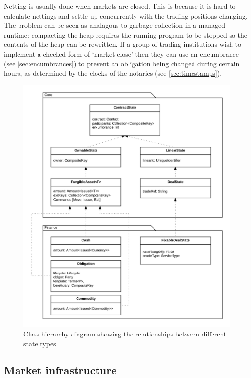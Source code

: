 \documentclass{article}
\begin{document}
Netting is usually done when markets are closed. This is because it is hard to calculate nettings and settle up
concurrently with the trading positions changing. The problem can be seen as analagous to garbage collection in
a managed runtime: compacting the heap requires the running program to be stopped so the contents of the heap
can be rewritten. If a group of trading institutions wish to implement a checked form of `market close' then they
can use an encumbrance (see \cref{sec:encumbrances}) to prevent an obligation being changed during certain hours,
as determined by the clocks of the notaries (see \cref{sec:timestamps}).

\begin{figure}[H]
\includegraphics[width=\textwidth]{state-class-hierarchy}
\caption{Class hierarchy diagram showing the relationships between different state types}
\end{figure}

\subsection{Market infrastructure}
\end{document}
